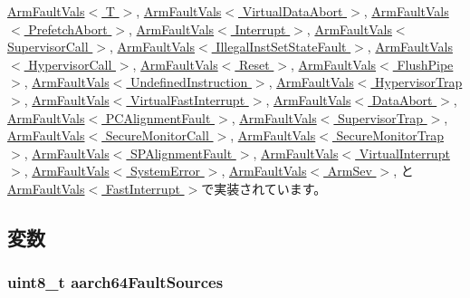 \hyperlink{classArmISA_1_1ArmFaultVals_ad8a859e85912fae683d889d24bedfe08}{ArmFaultVals$<$ T $>$}, \hyperlink{classArmISA_1_1ArmFaultVals_ad8a859e85912fae683d889d24bedfe08}{ArmFaultVals$<$ VirtualDataAbort $>$}, \hyperlink{classArmISA_1_1ArmFaultVals_ad8a859e85912fae683d889d24bedfe08}{ArmFaultVals$<$ PrefetchAbort $>$}, \hyperlink{classArmISA_1_1ArmFaultVals_ad8a859e85912fae683d889d24bedfe08}{ArmFaultVals$<$ Interrupt $>$}, \hyperlink{classArmISA_1_1ArmFaultVals_ad8a859e85912fae683d889d24bedfe08}{ArmFaultVals$<$ SupervisorCall $>$}, \hyperlink{classArmISA_1_1ArmFaultVals_ad8a859e85912fae683d889d24bedfe08}{ArmFaultVals$<$ IllegalInstSetStateFault $>$}, \hyperlink{classArmISA_1_1ArmFaultVals_ad8a859e85912fae683d889d24bedfe08}{ArmFaultVals$<$ HypervisorCall $>$}, \hyperlink{classArmISA_1_1ArmFaultVals_ad8a859e85912fae683d889d24bedfe08}{ArmFaultVals$<$ Reset $>$}, \hyperlink{classArmISA_1_1ArmFaultVals_ad8a859e85912fae683d889d24bedfe08}{ArmFaultVals$<$ FlushPipe $>$}, \hyperlink{classArmISA_1_1ArmFaultVals_ad8a859e85912fae683d889d24bedfe08}{ArmFaultVals$<$ UndefinedInstruction $>$}, \hyperlink{classArmISA_1_1ArmFaultVals_ad8a859e85912fae683d889d24bedfe08}{ArmFaultVals$<$ HypervisorTrap $>$}, \hyperlink{classArmISA_1_1ArmFaultVals_ad8a859e85912fae683d889d24bedfe08}{ArmFaultVals$<$ VirtualFastInterrupt $>$}, \hyperlink{classArmISA_1_1ArmFaultVals_ad8a859e85912fae683d889d24bedfe08}{ArmFaultVals$<$ DataAbort $>$}, \hyperlink{classArmISA_1_1ArmFaultVals_ad8a859e85912fae683d889d24bedfe08}{ArmFaultVals$<$ PCAlignmentFault $>$}, \hyperlink{classArmISA_1_1ArmFaultVals_ad8a859e85912fae683d889d24bedfe08}{ArmFaultVals$<$ SupervisorTrap $>$}, \hyperlink{classArmISA_1_1ArmFaultVals_ad8a859e85912fae683d889d24bedfe08}{ArmFaultVals$<$ SecureMonitorCall $>$}, \hyperlink{classArmISA_1_1ArmFaultVals_ad8a859e85912fae683d889d24bedfe08}{ArmFaultVals$<$ SecureMonitorTrap $>$}, \hyperlink{classArmISA_1_1ArmFaultVals_ad8a859e85912fae683d889d24bedfe08}{ArmFaultVals$<$ SPAlignmentFault $>$}, \hyperlink{classArmISA_1_1ArmFaultVals_ad8a859e85912fae683d889d24bedfe08}{ArmFaultVals$<$ VirtualInterrupt $>$}, \hyperlink{classArmISA_1_1ArmFaultVals_ad8a859e85912fae683d889d24bedfe08}{ArmFaultVals$<$ SystemError $>$}, \hyperlink{classArmISA_1_1ArmFaultVals_ad8a859e85912fae683d889d24bedfe08}{ArmFaultVals$<$ ArmSev $>$}, と \hyperlink{classArmISA_1_1ArmFaultVals_ad8a859e85912fae683d889d24bedfe08}{ArmFaultVals$<$ FastInterrupt $>$}で実装されています。

\subsection{変数}
\hypertarget{classArmISA_1_1ArmFault_a9717d5a209bf4c9a1c0641374bba08d6}{
\subsubsection[{aarch64FaultSources}]{\setlength{\rightskip}{0pt plus 5cm}uint8\_\-t {\bf aarch64FaultSources}}}
\label{classArmISA_1_1ArmFault_a9717d5a209bf4c9a1c0641374bba08d6}



